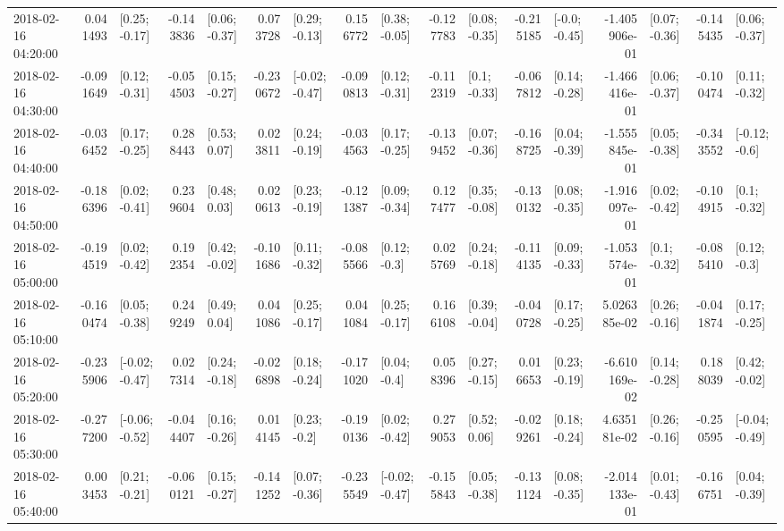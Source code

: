 \begin{tabular}{lrlrlrlrlrlrlrlrl}
2018-02-16 04:20:00 &  0.041493 &   [0.25; -0.17] & -0.143836 &   [0.06; -0.37] &  0.073728 &   [0.29; -0.13] &  0.156772 &   [0.38; -0.05] & -0.127783 &   [0.08; -0.35] & -0.215185 &   [-0.0; -0.45] & -1.405906e-01 &   [0.07; -0.36] & -0.145435 &   [0.06; -0.37] \\
2018-02-16 04:30:00 & -0.091649 &   [0.12; -0.31] & -0.054503 &   [0.15; -0.27] & -0.230672 &  [-0.02; -0.47] & -0.090813 &   [0.12; -0.31] & -0.112319 &    [0.1; -0.33] & -0.067812 &   [0.14; -0.28] & -1.466416e-01 &   [0.06; -0.37] & -0.100474 &   [0.11; -0.32] \\
2018-02-16 04:40:00 & -0.036452 &   [0.17; -0.25] &  0.288443 &    [0.53; 0.07] &  0.023811 &   [0.24; -0.19] & -0.034563 &   [0.17; -0.25] & -0.139452 &   [0.07; -0.36] & -0.168725 &   [0.04; -0.39] & -1.555845e-01 &   [0.05; -0.38] & -0.343552 &   [-0.12; -0.6] \\
2018-02-16 04:50:00 & -0.186396 &   [0.02; -0.41] &  0.239604 &    [0.48; 0.03] &  0.020613 &   [0.23; -0.19] & -0.121387 &   [0.09; -0.34] &  0.127477 &   [0.35; -0.08] & -0.130132 &   [0.08; -0.35] & -1.916097e-01 &   [0.02; -0.42] & -0.104915 &    [0.1; -0.32] \\
2018-02-16 05:00:00 & -0.194519 &   [0.02; -0.42] &  0.192354 &   [0.42; -0.02] & -0.101686 &   [0.11; -0.32] & -0.085566 &    [0.12; -0.3] &  0.025769 &   [0.24; -0.18] & -0.114135 &   [0.09; -0.33] & -1.053574e-01 &    [0.1; -0.32] & -0.085410 &    [0.12; -0.3] \\
2018-02-16 05:10:00 & -0.160474 &   [0.05; -0.38] &  0.249249 &    [0.49; 0.04] &  0.041086 &   [0.25; -0.17] &  0.041084 &   [0.25; -0.17] &  0.166108 &   [0.39; -0.04] & -0.040728 &   [0.17; -0.25] &  5.026385e-02 &   [0.26; -0.16] & -0.041874 &   [0.17; -0.25] \\
2018-02-16 05:20:00 & -0.235906 &  [-0.02; -0.47] &  0.027314 &   [0.24; -0.18] & -0.026898 &   [0.18; -0.24] & -0.171020 &    [0.04; -0.4] &  0.058396 &   [0.27; -0.15] &  0.016653 &   [0.23; -0.19] & -6.610169e-02 &   [0.14; -0.28] &  0.188039 &   [0.42; -0.02] \\
2018-02-16 05:30:00 & -0.277200 &  [-0.06; -0.52] & -0.044407 &   [0.16; -0.26] &  0.014145 &    [0.23; -0.2] & -0.190136 &   [0.02; -0.42] &  0.279053 &    [0.52; 0.06] & -0.029261 &   [0.18; -0.24] &  4.635181e-02 &   [0.26; -0.16] & -0.250595 &  [-0.04; -0.49] \\
2018-02-16 05:40:00 &  0.003453 &   [0.21; -0.21] & -0.060121 &   [0.15; -0.27] & -0.141252 &   [0.07; -0.36] & -0.235549 &  [-0.02; -0.47] & -0.155843 &   [0.05; -0.38] & -0.131124 &   [0.08; -0.35] & -2.014133e-01 &   [0.01; -0.43] & -0.166751 &   [0.04; -0.39] \\

\end{tabular}
